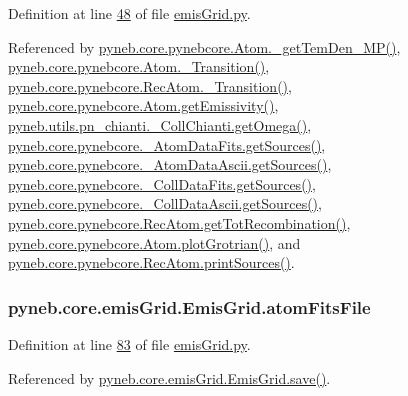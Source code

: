 Definition at line \hyperlink{emis_grid_8py_source_l00048}{48} of file \hyperlink{emis_grid_8py_source}{emis\+Grid.\+py}.



Referenced by \hyperlink{pynebcore_8py_source_l01980}{pyneb.\+core.\+pynebcore.\+Atom.\+\_\+get\+Tem\+Den\+\_\+\+M\+P()}, \hyperlink{pynebcore_8py_source_l01367}{pyneb.\+core.\+pynebcore.\+Atom.\+\_\+\+Transition()}, \hyperlink{pynebcore_8py_source_l02696}{pyneb.\+core.\+pynebcore.\+Rec\+Atom.\+\_\+\+Transition()}, \hyperlink{pynebcore_8py_source_l01716}{pyneb.\+core.\+pynebcore.\+Atom.\+get\+Emissivity()}, \hyperlink{pn__chianti_8py_source_l00484}{pyneb.\+utils.\+pn\+\_\+chianti.\+\_\+\+Coll\+Chianti.\+get\+Omega()}, \hyperlink{pynebcore_8py_source_l00183}{pyneb.\+core.\+pynebcore.\+\_\+\+Atom\+Data\+Fits.\+get\+Sources()}, \hyperlink{pynebcore_8py_source_l00448}{pyneb.\+core.\+pynebcore.\+\_\+\+Atom\+Data\+Ascii.\+get\+Sources()}, \hyperlink{pynebcore_8py_source_l00673}{pyneb.\+core.\+pynebcore.\+\_\+\+Coll\+Data\+Fits.\+get\+Sources()}, \hyperlink{pynebcore_8py_source_l01003}{pyneb.\+core.\+pynebcore.\+\_\+\+Coll\+Data\+Ascii.\+get\+Sources()}, \hyperlink{pynebcore_8py_source_l02735}{pyneb.\+core.\+pynebcore.\+Rec\+Atom.\+get\+Tot\+Recombination()}, \hyperlink{pynebcore_8py_source_l02372}{pyneb.\+core.\+pynebcore.\+Atom.\+plot\+Grotrian()}, and \hyperlink{pynebcore_8py_source_l02796}{pyneb.\+core.\+pynebcore.\+Rec\+Atom.\+print\+Sources()}.

\hypertarget{classpyneb_1_1core_1_1emis_grid_1_1_emis_grid_a5abe442aad7ee62b912ad97ec4d71d6c}{}
\subsubsection[{atom\+Fits\+File}]{\setlength{\rightskip}{0pt plus 5cm}pyneb.\+core.\+emis\+Grid.\+Emis\+Grid.\+atom\+Fits\+File}\label{classpyneb_1_1core_1_1emis_grid_1_1_emis_grid_a5abe442aad7ee62b912ad97ec4d71d6c}


Definition at line \hyperlink{emis_grid_8py_source_l00083}{83} of file \hyperlink{emis_grid_8py_source}{emis\+Grid.\+py}.



Referenced by \hyperlink{emis_grid_8py_source_l00096}{pyneb.\+core.\+emis\+Grid.\+Emis\+Grid.\+save()}.

